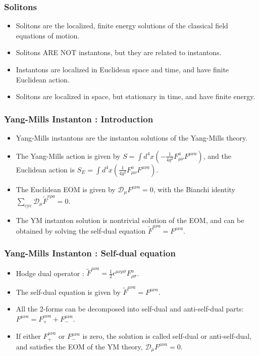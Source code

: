 \documentclass[10pt]{beamer}
\begin{document}
\begin{frame}
\frametitle{Solitons}
\begin{itemize}
\item Solitons are the localized, finite energy solutions of the classical field equations of motion.
\item Solitons ARE NOT instantons, but they are related to instantons.
\item Instantons are localized in Euclidean space and time, and have finite Euclidean action.
\item Solitons are localized in space, but stationary in time, and have finite energy.

\end{itemize}

\end{frame}
\begin{frame}
\frametitle{Yang-Mills Instanton : Introduction}
\begin{itemize}
\item Yang-Mills instantons are the instanton solutions of the Yang-Mills theory.
\item The Yang-Mills action is given by $S = \int d^4x \left(-\frac{1}{4g^2}F_{\mu\nu}^a F^{\mu\nu a}\right)$, and the Euclidean action is $S_E = \int d^4x \left(\frac{1}{4g^2}F_{\mu\nu}^a F^{\mu\nu a}\right)$.
\item The Euclidean EOM is given by $\mathcal{D}_\mu F^{\mu\nu a} = 0$, with the Bianchi identity $\sum_{\text{cyc}}\mathcal{D}_\mu \tilde{F}^{\nu\rho a} = 0$.
\item The YM instanton solution is nontrivial solution of the EOM, and can be obtained by solving the self-dual equation $\tilde{F}^{\mu\nu a} = F^{\mu\nu a}$.
\end{itemize}
\end{frame}

\begin{frame}
    \frametitle{Yang-Mills Instanton : Self-dual equation}
    \begin{itemize}
    \item Hodge dual operator : $\tilde{F}^{\mu\nu a} = \frac{1}{2}\epsilon^{\mu\nu\rho\sigma}F_{\rho\sigma}^a$.
    \item The self-dual equation is given by $\tilde{F}^{\mu\nu a} = F^{\mu\nu a}$.
    \item All the 2-forms can be decomposed into self-dual and anti-self-dual parts: $F^{\mu\nu a} = F^{\mu\nu a}_+ + F^{\mu\nu a}_-$.
    \item If either $F^{\mu\nu a}_+$ or $F^{\mu\nu a}_-$ is zero, the solution is called self-dual or anti-self-dual, and satisfies the EOM of the YM theory, $\mathcal{D}_\mu F^{\mu\nu a} = 0$.
    \end{itemize}
    \end{frame}
\end{document}
